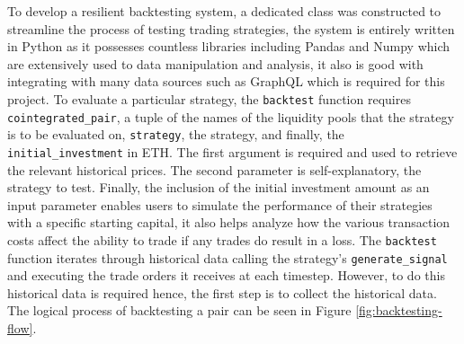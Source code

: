 To develop a resilient backtesting system, a dedicated class was constructed to streamline the process of testing trading strategies, the system is entirely written in Python as it possesses countless libraries including Pandas and Numpy which are extensively used to data manipulation and analysis, it also is good with integrating with many data sources such as GraphQL which is required for this project. To evaluate a particular strategy, the \texttt{backtest} function requires \texttt{cointegrated\_pair}, a tuple of the names of the liquidity pools that the strategy is to be evaluated on, \texttt{strategy}, the strategy, and finally, the \texttt{initial\_investment} in ETH. The first argument is required and used to retrieve the relevant historical prices. The second parameter is self-explanatory, the strategy to test. Finally, the inclusion of the initial investment amount as an input parameter enables users to simulate the performance of their strategies with a specific starting capital, it also helps analyze how the various transaction costs affect the ability to trade if any trades do result in a loss. The \texttt{backtest} function iterates through historical data calling the strategy's \texttt{generate\_signal} and executing the trade orders it receives at each timestep. However, to do this historical data is required hence, the first step is to collect the historical data. The logical process of backtesting a pair can be seen in Figure \ref{fig:backtesting-flow}.

